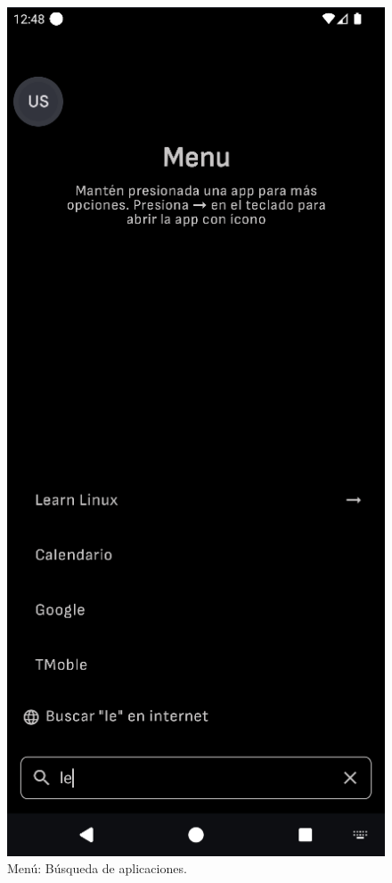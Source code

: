 \begin{figure}[ht!]
\begin{minipage}{0.43\textwidth}
  \end{minipage}\hspace{0.05\textwidth}
  \begin{minipage}{0.43\textwidth}
    \caption{Menú: Búsqueda de aplicaciones.}
    \label{fig:menu_busqueda_aplicaciones}
    \includegraphics[width=\textwidth]{Figuras/secciones/menu_busqueda_aplicaciones.png}
    \centering
  \end{minipage}
\end{figure}


